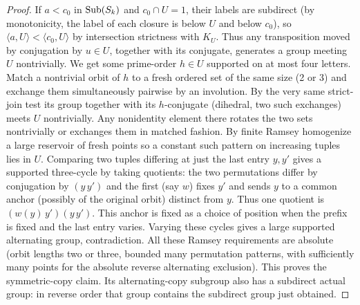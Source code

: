 \begin{proof}
If \(a<c_0\) in \({\rm Sub}(S_k)\) and \(c_0\cap U=1\), their labels are subdirect (by
monotonicity, the label of each closure is below \(U\) and below \(c_0\)), so \(\langle
a,U\rangle<\langle c_0,U\rangle\) by intersection strictness with \(K_U\). Thus any transposition
moved by conjugation by \(u\in U\), together with its conjugate, generates a group meeting \(U\)
nontrivially. We get some prime-order \(h\in U\) supported on at most four letters. Match a
nontrivial orbit of \(h\) to a fresh ordered set of the same size (2 or 3) and exchange them
simultaneously pairwise by an involution. By the very same strict-join test its group together
with its \(h\)-conjugate (dihedral, two such exchanges) meets \(U\) nontrivially. Any nonidentity
element there rotates the two sets nontrivially or exchanges them in matched fashion. By finite
Ramsey homogenize a large reservoir of fresh points so a constant such pattern on increasing
tuples lies in \(U\). Comparing two tuples differing at just the last entry \(y,y'\) gives a
supported three-cycle by taking quotients: the two permutations differ by conjugation by
\((y\,y')\) and the first (say \(w\)) fixes \(y'\) and sends \(y\) to a common anchor (possibly of
the original orbit) distinct from \(y\). Thus one quotient is \((w(y)\,y')(y\,y')\). This anchor
is fixed as a choice of position when the prefix is fixed and the last entry varies. Varying these
cycles gives a large supported alternating group, contradiction. All these Ramsey requirements are
absolute (orbit lengths two or three, bounded many permutation patterns, with sufficiently many
points for the absolute reverse alternating exclusion). This proves the symmetric-copy claim.  Its
alternating-copy subgroup also
has a subdirect actual group: in reverse order that group contains the
subdirect group just obtained.
\end{proof}

